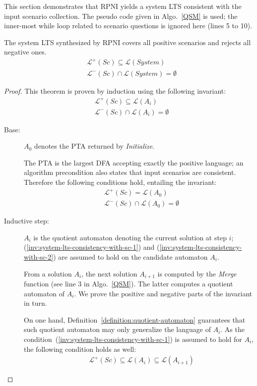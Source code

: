 This section demonstrates that RPNI yields a system LTS consistent with the input scenario collection. The pseudo code given in Algo.~\ref{QSM} is used; the inner-most while loop related to scenario questions is ignored here (lines 5 to 10).

\begin{theorem}
\label{theorem:system-lts-consistency-with-sc}
The system LTS synthesized by RPNI covers all positive scenarios and rejects all negative ones.
\begin{align*}
&\mathcal{L}^+(Sc) \subseteq \mathcal{L}(System)\\
&\mathcal{L}^-(Sc) \cap      \mathcal{L}(System) = \emptyset
\end{align*}

\begin{proof}
This theorem is proven by induction using the following invariant:
\begin{align}
&\mathcal{L}^+(Sc) \subseteq \mathcal{L}(A_i)\label{inv:system-lts-consistency-with-sc-1}\\
&\mathcal{L}^-(Sc) \cap      \mathcal{L}(A_i) = \emptyset\label{inv:system-lts-consistency-with-sc-2}
\end{align}

\begin{description}
\item[Base:] $A_0$ denotes the PTA returned by \emph{Initialize}.

The PTA is the largest DFA accepting exactly the positive language; an algorithm precondition also states that input scenarios are consistent. Therefore the following conditions hold, entailing the invariant:
\begin{align*}
&\mathcal{L}^+(Sc) =    \mathcal{L}(A_0)\\
&\mathcal{L}^-(Sc) \cap \mathcal{L}(A_0) = \emptyset
\end{align*}

\item[Inductive step:] $A_i$ is the quotient automaton denoting the current solution at step $i$; (\ref{inv:system-lts-consistency-with-sc-1}) and (\ref{inv:system-lts-consistency-with-sc-2}) are assumed to hold on the candidate automaton $A_i$.

From a solution $A_i$, the next solution $A_{i+1}$ is computed by the \emph{Merge} function (see line 3 in Algo.~\ref{QSM}). The latter computes a quotient automaton of $A_i$. We prove the positive and negative parts of the invariant in turn.

On one hand, Definition~\ref{definition:quotient-automaton} guarantees that such quotient automaton may only generalize the language of $A_i$. As the condition~(\ref{inv:system-lts-consistency-with-sc-1}) is assumed to hold for $A_i$, the following condition holds as well:
\begin{align*}
&\mathcal{L}^+(Sc) \subseteq \mathcal{L}(A_i) \subseteq \mathcal{L}(A_{i+1})
\end{align*}


\end{description}
\end{proof}
\end{theorem}

